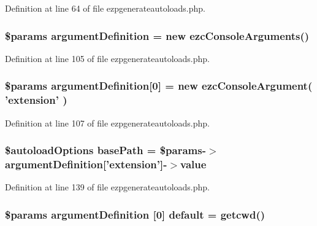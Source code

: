 \-Definition at line 64 of file ezpgenerateautoloads.\-php.

\hypertarget{ezpgenerateautoloads_8php_ab9a0a1710f335bc48a13e8a94802be23}{
\subsubsection[{argument\-Definition}]{\setlength{\rightskip}{0pt plus 5cm}\$params {\bf argument\-Definition} = new ezc\-Console\-Arguments()}}\label{ezpgenerateautoloads_8php_ab9a0a1710f335bc48a13e8a94802be23}


\-Definition at line 105 of file ezpgenerateautoloads.\-php.

\hypertarget{ezpgenerateautoloads_8php_aed0ba19f5204d9659e823271642a6594}{
\subsubsection[{argument\-Definition}]{\setlength{\rightskip}{0pt plus 5cm}\$params {\bf argument\-Definition}\mbox{[}0\mbox{]} = new ezc\-Console\-Argument( 'extension' )}}\label{ezpgenerateautoloads_8php_aed0ba19f5204d9659e823271642a6594}


\-Definition at line 107 of file ezpgenerateautoloads.\-php.

\hypertarget{ezpgenerateautoloads_8php_a29816a8455ff45c83cd2e389735c8207}{
\subsubsection[{base\-Path}]{\setlength{\rightskip}{0pt plus 5cm}\$autoload\-Options {\bf base\-Path} = \$params-\/$>${\bf argument\-Definition}\mbox{[}'extension'\mbox{]}-\/$>$value}}\label{ezpgenerateautoloads_8php_a29816a8455ff45c83cd2e389735c8207}


\-Definition at line 139 of file ezpgenerateautoloads.\-php.

\hypertarget{ezpgenerateautoloads_8php_a7cbde127000429b4c1ee76be227eca44}{
\subsubsection[{default}]{\setlength{\rightskip}{0pt plus 5cm}\$params {\bf argument\-Definition} \mbox{[}0\mbox{]} {\bf default} = getcwd()}}\label{ezpgenerateautoloads_8php_a7cbde127000429b4c1ee76be227eca44}


